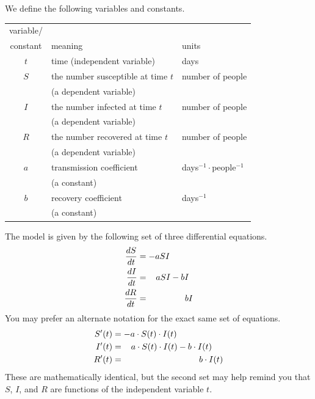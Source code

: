\documentclass[12pt]{article}
\newcommand{\<}{\langle}
\renewcommand{\>}{\rangle}
\begin{document}
\noindent We define the following variables and constants.
\renewcommand{\arraystretch}{1}
	\begin{center}
	\begin{tabular}{|c|l|l|}
	\hline
	variable/	&					&\\
	constant	& meaning			& units\\
	\hline \hline
	$t$	& time (independent variable)	& days\\
	\hline
	$S$	& the number susceptible at time $t$	& number of people\\
		& (a dependent variable)		&\\
	\hline
	$I$	& the number infected at time $t$	& number of people\\
		& (a dependent variable)		&\\
	\hline
	$R$	& the number recovered at time $t$	& number of people\\
		& (a dependent variable)		&\\
	\hline
	$a$	& transmission coefficient		& days$^{-1} \cdot $people$^{-1}$\\
		& (a constant)				&\\
	\hline
	$b$	& recovery coefficient		& days$^{-1}$\\
		& (a constant)				&\\
	\hline
	\end{tabular}
	\end{center}
\renewcommand{\arraystretch}{1.5}
\noindent The model is given by the following set of three differential equations.
	\begin{align}
	 \frac{dS}{dt}	&= -aSI  \\
	 \frac{dI}{dt}	&= \hspace{0.3cm}aSI - bI	 \\
	 \frac{dR}{dt}	&=  \hspace{1.5cm}bI
	\end{align}
\noindent You may prefer an alternate notation for the exact same set of equations.
	\begin{align}
	S'(t)	&= -a\cdot S(t) \cdot I(t)  					\label{SEqun}\\
	 I'(t)	&= \hspace{0.3cm}a\cdot S(t) \cdot I(t) - b\cdot I(t)		\label{IEqun}\\
	 R'(t)	&=  \hspace{3.1cm}b\cdot I(t)		\label{REqun}
	\end{align}
\noindent  These are mathematically identical, but the second set may help remind you that $S$, $I$,
and $R$ are functions of the independent variable $t$.\\
	
\end{document}
